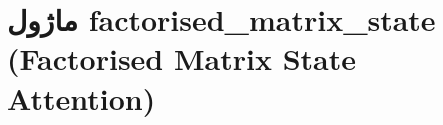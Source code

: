 \section{ماژول factorised\_matrix\_state (Factorised Matrix State Attention)}
\label{sec:module_factorised_matrix_state}
